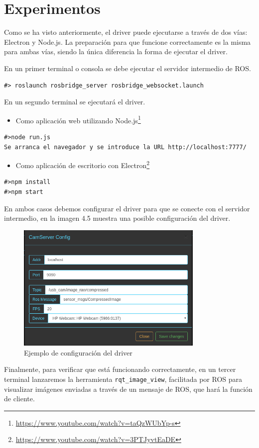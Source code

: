\section{Experimentos}
Como se ha visto anteriormente, el driver puede ejecutarse a través de dos vías: Electron y Node.js. La preparación para que funcione correctamente es la misma para ambas vías, siendo la única diferencia la forma de ejecutar el driver.

En un primer terminal o consola se debe ejecutar el servidor intermedio de ROS.

\begin{lstlisting}[caption= Ejecución del servidor intermedio, label=cod.servidorintermedio]
#> roslaunch rosbridge_server rosbridge_websocket.launch
\end{lstlisting}
En un segundo terminal se ejecutará el driver.
\begin{itemize}
\item 
Como aplicación web utilizando Node.js\footnote{\url{https://www.youtube.com/watch?v=taQzWUbYp-s}}
\end{itemize}
\begin{lstlisting}[caption= Ejecución con Node.js, label=cod.nodejs]
#>node run.js
Se arranca el navegador y se introduce la URL http://localhost:7777/
\end{lstlisting}
\begin{itemize}
\item 
Como aplicación de escritorio con Electron\footnote{\url{https://www.youtube.com/watch?v=3PTJyvtEaDE}}
\end{itemize}
\begin{lstlisting}[caption= Ejecución con Electron, label=cod.electron]
#>npm install
#>npm start
\end{lstlisting}
En ambos casos debemos configurar el driver para que se conecte con el servidor intermedio, en la imagen 4.5 muestra una posible configuración del driver.
\begin{figure}[H]
  \begin{center}
    \includegraphics[width=0.8\textwidth]{figures/configcamservertest.png}
		\caption{Ejemplo de configuración del driver}
		\label{fig.esquemacamserver}
		\end{center}
\end{figure}
Finalmente, para verificar que está funcionando correctamente, en un tercer terminal lanzaremos la herramienta \texttt{rqt\_image\_view}, facilitada por ROS para visualizar imágenes enviadas a través de un mensaje de ROS, que hará la función de cliente.

